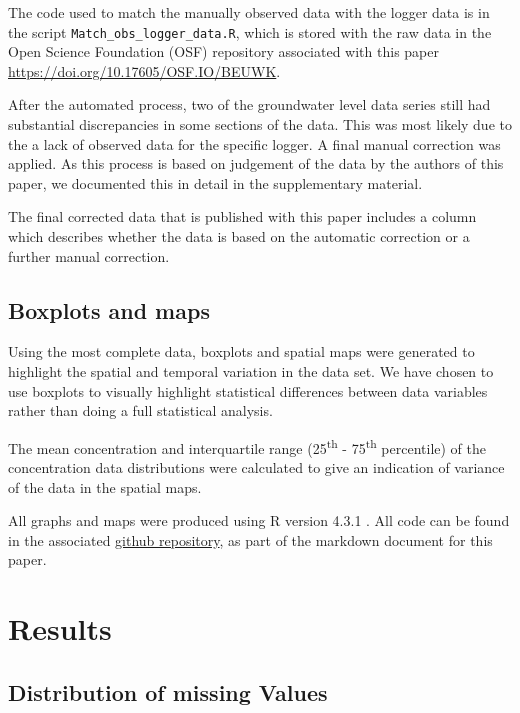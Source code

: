 \documentclass[, manuscript]{copernicus}
\begin{document}
The code used to match the manually observed data with the logger data
is in the script \texttt{Match\_obs\_logger\_data.R}, which is stored
with the raw data in the Open Science Foundation (OSF) repository
associated with this paper \url{https://doi.org/10.17605/OSF.IO/BEUWK}.

After the automated process, two of the groundwater level data series
still had substantial discrepancies in some sections of the data. This
was most likely due to the a lack of observed data for the specific
logger. A final manual correction was applied. As this process is based
on judgement of the data by the authors of this paper, we documented
this in detail in the supplementary material.

The final corrected data that is published with this paper includes a
column which describes whether the data is based on the automatic
correction or a further manual correction.

\subsection{Boxplots and maps}

Using the most complete data, boxplots and spatial maps were generated
to highlight the spatial and temporal variation in the data set. We have
chosen to use boxplots to visually highlight statistical differences
between data variables rather than doing a full statistical analysis.

The mean concentration and interquartile range (25\textsuperscript{th} -
75\textsuperscript{th} percentile) of the concentration data
distributions were calculated to give an indication of variance of the
data in the spatial maps.

All graphs and maps were produced using R version 4.3.1 \citep{R2023}.
All code can be found in the associated
\href{https://github.com/WillemVervoort/MuttamaDataPaper}{github
repository}, as part of the markdown document for this paper.

\section{Results}

\subsection{Distribution of missing Values}
\end{document}
